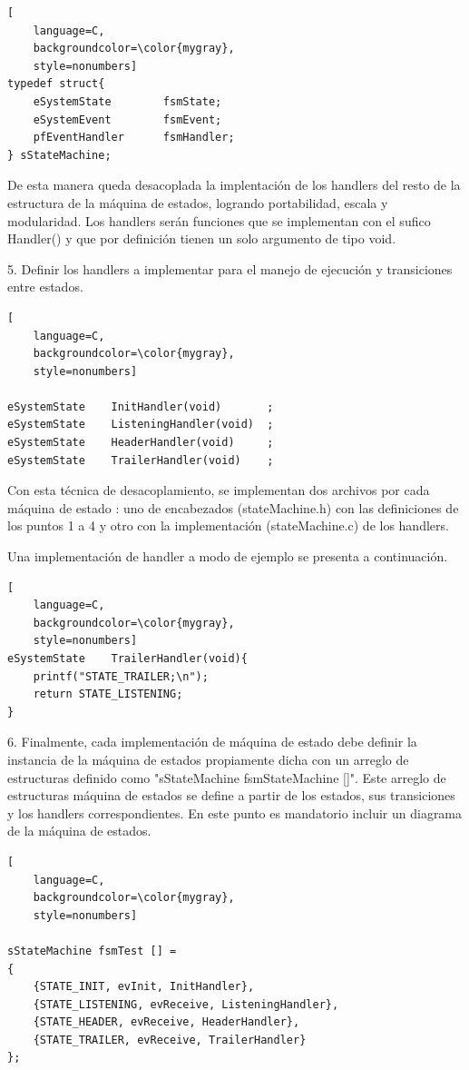 \begin{lstlisting}[
	language=C, 
	backgroundcolor=\color{mygray},
	style=nonumbers]
typedef struct{
	eSystemState 		fsmState;
	eSystemEvent 		fsmEvent;
	pfEventHandler 		fsmHandler;
} sStateMachine;
\end{lstlisting}

De esta manera queda desacoplada la implentación de los handlers del resto de la estructura de la máquina de estados, logrando portabilidad, escala y modularidad. Los handlers serán funciones que se implementan con el sufico Handler() y que por definición tienen un solo argumento de tipo void.

5. Definir los handlers a implementar para el manejo de ejecución y transiciones entre estados.

\begin{lstlisting}[
	language=C, 
	backgroundcolor=\color{mygray},
	style=nonumbers]

eSystemState 	InitHandler(void)		;
eSystemState 	ListeningHandler(void)	;
eSystemState 	HeaderHandler(void)		;
eSystemState 	TrailerHandler(void) 	;

\end{lstlisting}

Con esta técnica de desacoplamiento, se implementan dos archivos por cada máquina de estado : uno de encabezados (stateMachine.h) con las definiciones de los puntos 1 a 4 y otro con la implementación (stateMachine.c) de los handlers.

Una implementación de handler a modo de ejemplo se presenta a continuación.

\begin{lstlisting}[
	language=C, 
	backgroundcolor=\color{mygray},
	style=nonumbers]
eSystemState 	TrailerHandler(void){ 
	printf("STATE_TRAILER;\n");
	return STATE_LISTENING; 
}
\end{lstlisting}

6. Finalmente, cada implementación de máquina de estado debe definir la instancia de la máquina de estados propiamente dicha con un arreglo de estructuras definido como "sStateMachine fsmStateMachine []". Este arreglo de estructuras máquina de estados se define a partir de los estados, sus transiciones y los handlers correspondientes. En este punto es mandatorio incluir un diagrama de la máquina de estados.

\begin{lstlisting}[
	language=C, 
	backgroundcolor=\color{mygray},
	style=nonumbers]

sStateMachine fsmTest [] = 
{
	{STATE_INIT, evInit, InitHandler},
	{STATE_LISTENING, evReceive, ListeningHandler},
	{STATE_HEADER, evReceive, HeaderHandler},
	{STATE_TRAILER, evReceive, TrailerHandler}
};
\end{lstlisting}


